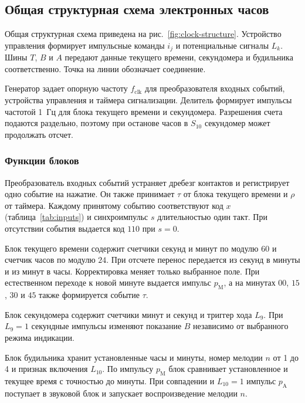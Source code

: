 \newpage
\subsection{Общая структурная схема электронных часов}
\label{sec:clock-structure}

Общая структурная схема приведена на рис.~\ref{fig:clock-structure}. Устройство управления формирует импульсные команды $i_j$ и потенциальные сигналы $L_k$. Шины $T$, $B$ и $A$ передают данные текущего времени, секундомера и будильника соответственно. Точка на линии обозначает соединение.



Генератор задает опорную частоту $f_{\mathrm{clk}}$ для преобразователя входных событий, устройства управления и таймера сигнализации. Делитель формирует импульсы частотой 1~Гц для блока текущего времени и секундомера. Разрешения счета подаются раздельно, поэтому при останове часов в $S_{10}$ секундомер может продолжать отсчет.

\newpage
\subsubsection{Функции блоков}
\label{sec:clock-blocks}

Преобразователь входных событий устраняет дребезг контактов и регистрирует одно событие на нажатие. Он также принимает $\tau$ от блока текущего времени и $\rho$ от таймера. Каждому принятому событию соответствуют код $x$ (таблица~\ref{tab:inputs}) и синхроимпульс $s$ длительностью один такт. При отсутствии события выдается код $110$ при $s=0$.

Блок текущего времени содержит счетчики секунд и минут по модулю $60$ и счетчик часов по модулю $24$. При отсчете перенос передается из секунд в минуты и из минут в часы. Корректировка меняет только выбранное поле. При естественном переходе к новой минуте выдается импульс $p_{\mathrm M}$, а на минутах $00$, $15$, $30$ и $45$ также формируется событие $\tau$.

Блок секундомера содержит счетчики минут и секунд и триггер хода $L_9$. При $L_9=1$ секундные импульсы изменяют показание $B$ независимо от выбранного режима индикации.

Блок будильника хранит установленные часы и минуты, номер мелодии $n$ от 1 до 4 и признак включения $L_{10}$. По импульсу $p_{\mathrm M}$ блок сравнивает установленное и текущее время с точностью до минуты. При совпадении и $L_{10}=1$ импульс $p_{\mathrm A}$ поступает в звуковой блок и запускает воспроизведение мелодии $n$.


